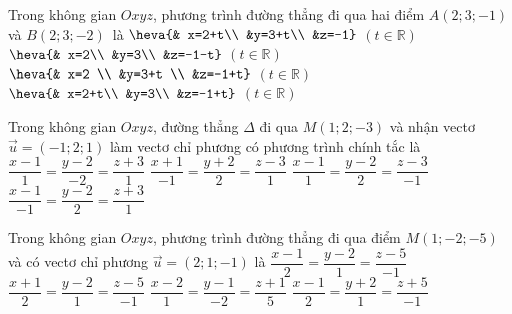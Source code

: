 \begin{ex}%
	Trong  không gian $Oxyz$, phương trình đường thẳng đi qua hai điểm $A(2;3;-1)$ và $B(2;3;-2)$~là
	\choice 
		{$\heva{& x=2+t\\ &y=3+t\\ &z=-1}$ $(t \in  \mathbb{R})$}
		{\True $\heva{&  x=2\\ &y=3\\ &z=-1-t}$ $(t \in \mathbb{R})$}
		{$\heva{& x=2 \\ &y=3+t \\ &z=-1+t}$ $(t \in \mathbb{R})$} 
		{$\heva{& x=2+t\\ &y=3\\  &z=-1+t}$ $(t \in \mathbb{R})$}
\end{ex}

\begin{ex}%
	Trong không gian $Oxyz$, đường thẳng $\Delta$ đi qua $M(1;2;-3)$ và nhận vectơ $\overrightarrow{u}=(-1;2;1)$ làm vectơ chỉ phương có phương trình chính  tắc là
	\choice 
		{$\dfrac{x-1}{1}=\dfrac{y-2}{-2}=\dfrac{z+3}{1}$} 
		{$\dfrac{x+1}{-1}=\dfrac{y+2}{2}=\dfrac{z-3}{1}$} 
		{$\dfrac{x-1}{1}=\dfrac{y-2}{2}=\dfrac{z-3}{-1}$} 
		 {\True$\dfrac{x-1}{-1}=\dfrac{y-2}{2}=\dfrac{z+3}{1}$}
\end{ex}

\begin{ex}%
	Trong không gian  $Oxyz$, phương trình đường thẳng đi qua điểm $M(1;-2;-5)$ và có vectơ chỉ phương $\overrightarrow{u}=(2;1;-1)$ là
	\choice 
		 {$\dfrac{x-1}{2}=\dfrac{y-2}{1}=\dfrac{z-5}{-1}$}
		{$\dfrac{x+1}{2}=\dfrac{y-2}{1}=\dfrac{z-5}{-1}$} 
		 {$\dfrac{x-2}{1}=\dfrac{y-1}{-2}=\dfrac{z+1}{5}$}
		 {\True $\dfrac{x-1}{2}=\dfrac{y+2}{1}=\dfrac{z+5}{-1}$}
\end{ex}

